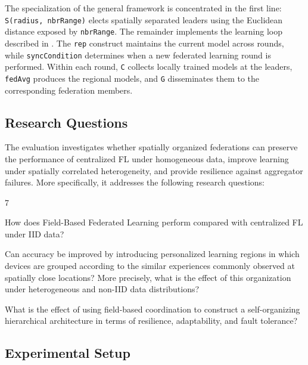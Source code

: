 The specialization of the general framework is concentrated in the first line:
 \lstinline[language=scafi]|S(radius, nbrRange)| elects spatially separated
 leaders using the Euclidean distance exposed by \lstinline[language=scafi]|nbrRange|.
%
The remainder implements the learning loop described in .
%
The \lstinline[language=scafi]|rep| construct maintains the current model across rounds, 
 while \lstinline[language=scafi]|syncCondition| determines when a new federated learning round is performed.
%
Within each round, \texttt{C} collects locally trained models at the leaders,
 \lstinline[language=scafi]|fedAvg| produces the regional models, 
 and \texttt{G} disseminates them to the corresponding federation members.


\subsection{Research Questions}
\label{sec:fbfl-research-questions}

The evaluation investigates whether spatially organized federations can preserve
 the performance of centralized \gls{FL} under homogeneous data, 
 improve learning under spatially correlated heterogeneity, 
 and provide resilience against aggregator failures.
%
More specifically, 
 it addresses the following research questions:

\begin{chapRQ}{7}
  \item
  How does Field-Based Federated Learning perform compared with centralized
  \gls{FL} under \gls{IID} data?
  \label{rq:fbfl-iid}

  \item
  Can accuracy be improved by introducing personalized learning regions in
  which devices are grouped according to the similar experiences commonly
  observed at spatially close locations?
  More precisely, what is the effect of this organization under heterogeneous
  and non-\gls{IID} data distributions?
  \label{rq:fbfl-non-iid}

  \item
  What is the effect of using field-based coordination to construct a
  self-organizing hierarchical architecture in terms of resilience,
  adaptability, and fault tolerance?
  \label{rq:fbfl-resilience}
\end{chapRQ}


\subsection{Experimental Setup}
\label{sec:fbfl-experimental-setup}

